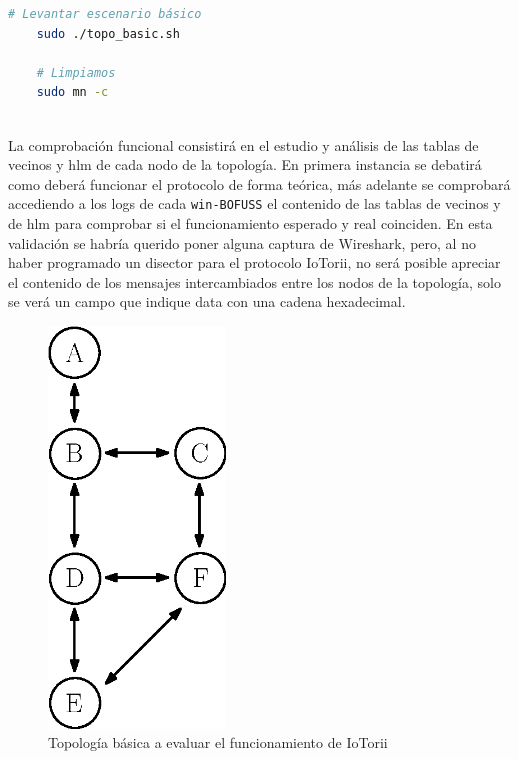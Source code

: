 \begin{lstlisting}[language= bash, style=Consola, caption={Puesta en marcha y limpieza del escenario},label=code:eva_scenario]
    # Levantar escenario básico
    sudo ./topo_basic.sh
    
    # Limpiamos
    sudo mn -c
    
\end{lstlisting}
\vspace{0.5cm}

La comprobación funcional consistirá en el estudio y análisis de las tablas de vecinos y \gls{hlm} de cada nodo de la topología. En primera instancia se debatirá como deberá funcionar el protocolo de forma teórica, más adelante se comprobará accediendo a los logs de cada \texttt{win-BOFUSS} el contenido de las tablas de vecinos y de \gls{hlm} para comprobar si el funcionamiento esperado y real coinciden. En esta validación se habría querido poner alguna captura de Wireshark, pero, al no haber programado un disector para el protocolo IoTorii, no será posible apreciar el contenido de los mensajes intercambiados entre los nodos de la topología, solo se verá un campo que indique data con una cadena hexadecimal.\\


\begin{figure}[ht]
    \centering
    \includegraphics[width=0.42\textwidth]{archivos/img/dev/topo_eva.eps}
    \caption{Topología básica a evaluar el funcionamiento de IoTorii}
    \label{fig:topo_eva}
\end{figure}

